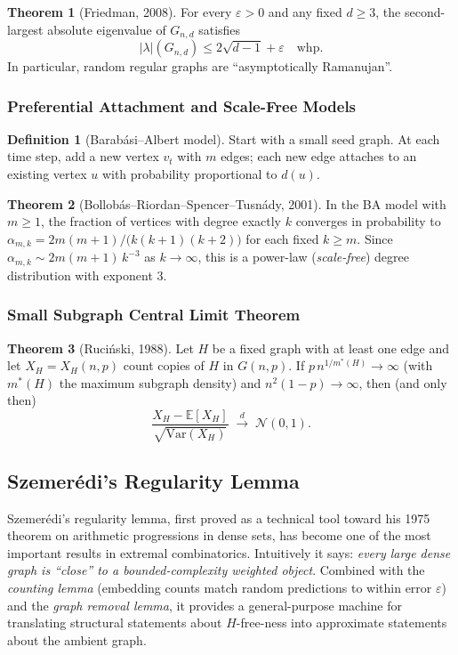 \documentclass{article}
\theoremstyle{definition}
\newtheorem{theorem}{Theorem}
\newtheorem{definition}{Definition}
\begin{document}
\begin{theorem}[Friedman, 2008]
For every $\varepsilon > 0$ and any fixed $d \ge 3$, the second-largest
absolute eigenvalue of $G_{n, d}$ satisfies
\[
  |\lambda|(G_{n, d}) \le 2\sqrt{d - 1} + \varepsilon \quad \text{whp}.
\]
In particular, random regular graphs are ``asymptotically Ramanujan''.
\end{theorem}

\subsubsection{Preferential Attachment and Scale-Free Models}

\begin{definition}[Barab\'asi--Albert model]
Start with a small seed graph. At each time step, add a new vertex
$v_t$ with $m$ edges; each new edge attaches to an existing vertex
$u$ with probability proportional to $d(u)$.
\end{definition}

\begin{theorem}[Bollob\'as--Riordan--Spencer--Tusn\'ady, 2001]
In the BA model with $m \ge 1$, the fraction of vertices with degree
exactly $k$ converges in probability to
$\alpha_{m,k} = 2m(m + 1)/\big(k(k + 1)(k + 2)\big)$ for each fixed $k \ge m$.
Since $\alpha_{m,k} \sim 2m(m + 1)\, k^{-3}$ as $k \to \infty$, this is a
power-law (\emph{scale-free}) degree distribution with exponent $3$.
\end{theorem}

\subsubsection{Small Subgraph Central Limit Theorem}

\begin{theorem}[Ruci\'nski, 1988]
Let $H$ be a fixed graph with at least one edge and let $X_H = X_H(n, p)$
count copies of $H$ in $G(n, p)$. If $p\, n^{1/m^*(H)} \to \infty$ (with
$m^*(H)$ the maximum subgraph density) and
$n^2(1 - p) \to \infty$, then (and only then)
\[
  \frac{X_H - \mathbb{E}[X_H]}{\sqrt{\mathrm{Var}(X_H)}} \;\xrightarrow{d}\; \mathcal{N}(0, 1).
\]
\end{theorem}

\subsection{Szemer\'edi's Regularity Lemma}

Szemer\'edi's regularity lemma, first proved as a technical tool
toward his 1975 theorem on arithmetic progressions in dense sets,
has become one of the most important results in extremal
combinatorics. Intuitively it says: \emph{every large dense graph is
``close'' to a bounded-complexity weighted object}. Combined with the
\emph{counting lemma} (embedding counts match random predictions to
within error $\varepsilon$) and the \emph{graph removal lemma}, it provides
a general-purpose machine for translating structural statements
about $H$-free-ness into approximate statements about the ambient
graph.
\end{document}
